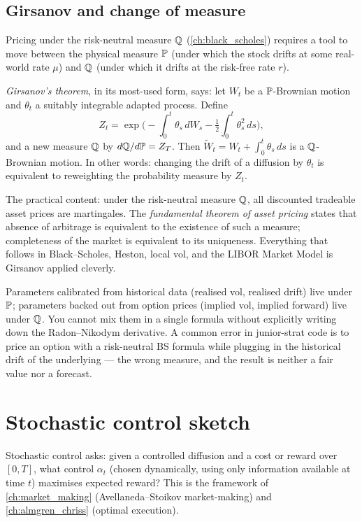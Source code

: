 \subsection{Girsanov and change of measure}

Pricing under the risk-neutral measure $\mathbb{Q}$ (\cref{ch:black_scholes})
requires a tool to move between the physical measure $\mathbb{P}$ (under
which the stock drifts at some real-world rate $\mu$) and $\mathbb{Q}$ (under
which it drifts at the risk-free rate $r$).

\emph{Girsanov's theorem}, in its most-used form, says: let $W_t$ be a
$\mathbb{P}$-Brownian motion and $\theta_t$ a suitably integrable adapted
process. Define
\[
Z_t = \exp\!\Big(-\!\int_0^t \theta_s\, dW_s - \tfrac{1}{2}\int_0^t \theta_s^2\, ds\Big),
\]
and a new measure $\mathbb{Q}$ by $d\mathbb{Q}/d\mathbb{P} = Z_T$. Then
$\widetilde W_t = W_t + \int_0^t \theta_s\, ds$ is a $\mathbb{Q}$-Brownian
motion. In other words: changing the drift of a diffusion by $\theta_t$
is equivalent to reweighting the probability measure by $Z_t$.

The practical content: under the risk-neutral measure $\mathbb{Q}$, all
discounted tradeable asset prices are martingales. The
\emph{fundamental theorem of asset pricing} states that absence of
arbitrage is equivalent to the existence of such a measure; completeness
of the market is equivalent to its uniqueness. Everything that
follows in Black--Scholes, Heston, local vol, and the LIBOR Market
Model is Girsanov applied cleverly.

\begin{pitfallbox}
Parameters calibrated from historical data (realised vol, realised
drift) live under $\mathbb{P}$; parameters backed out from option prices
(implied vol, implied forward) live under $\mathbb{Q}$. You cannot mix them
in a single formula without explicitly writing down the Radon--Nikodym
derivative. A common error in junior-strat code is to price an option
with a risk-neutral BS formula while plugging in the historical drift
of the underlying --- the wrong measure, and the result is neither a
fair value nor a forecast.
\end{pitfallbox}

\section{Stochastic control sketch}
\label{sec:app_math_control}

Stochastic control asks: given a controlled diffusion and a cost or
reward over $[0,T]$, what control $\alpha_t$ (chosen dynamically, using
only information available at time $t$) maximises expected reward?
This is the framework of \cref{ch:market_making} (Avellaneda--Stoikov
market-making) and \cref{ch:almgren_chriss} (optimal execution).

